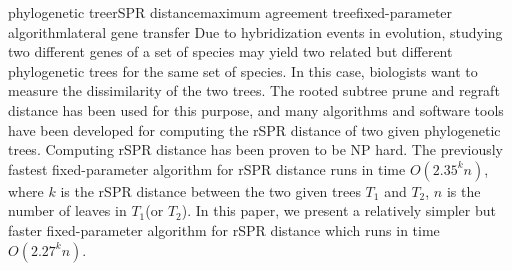 
\begin{Eabstract}{phylogenetic tree}{rSPR distance}{maximum agreement tree}{fixed-parameter algorithm}{lateral gene transfer}
Due to hybridization events in evolution, studying two different genes of a set of species may yield two related but different phylogenetic trees for the same set of species. In this case, biologists want to measure the dissimilarity of the two trees. The rooted subtree prune and regraft distance has been used for this purpose, and many algorithms and software tools have been developed for computing the rSPR distance of two given phylogenetic trees. Computing rSPR distance has been proven to be NP hard. The previously fastest fixed-parameter algorithm for rSPR distance runs in time $O(2.35^kn)$, where $k$ is the rSPR distance between the two given trees $T_1$ and $T_2$, $n$ is the number of leaves in $T_1$(or $T_2$). In this paper, we present a relatively simpler but faster fixed-parameter algorithm for rSPR distance which runs in time $O(2.27^kn)$.
\end{Eabstract}
